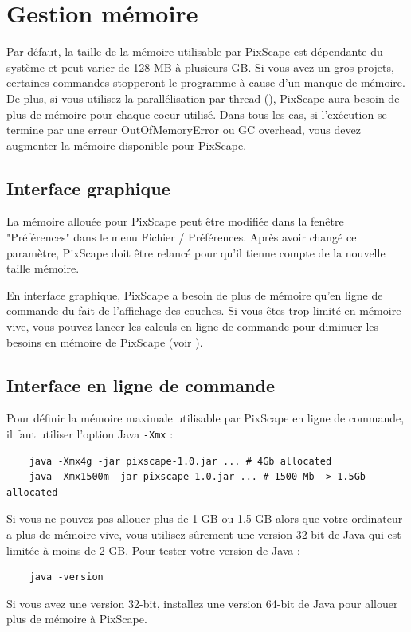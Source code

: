 \documentclass{report}
\begin{document}
\section{Gestion mémoire}
\label{memory}
Par défaut, la taille de la mémoire utilisable par PixScape est dépendante du système et peut varier de 128 MB à plusieurs GB.
Si vous avez un gros projets, certaines commandes stopperont le programme à cause d'un manque de mémoire. De plus, si vous utilisez la parallélisation par thread (), PixScape aura besoin de plus de mémoire pour chaque coeur utilisé.
Dans tous les cas, si l'exécution se termine par une erreur OutOfMemoryError ou GC overhead, vous devez augmenter la mémoire disponible pour PixScape.

\subsection{Interface graphique}
La mémoire allouée pour PixScape peut être modifiée dans la fenêtre "Préférences" dans le menu Fichier / Préférences. Après avoir changé ce paramètre, PixScape doit être relancé pour qu'il tienne compte de la nouvelle taille mémoire.

En interface graphique, PixScape a besoin de plus de mémoire qu'en ligne de commande du fait de l'affichage des couches. Si vous êtes trop limité en mémoire vive, vous pouvez lancer les calculs en ligne de commande pour diminuer les besoins en mémoire de PixScape (voir ).

\subsection{Interface en ligne de commande}
Pour définir la mémoire maximale utilisable par PixScape en ligne de commande, il faut utiliser l'option Java \verb|-Xmx| :
\begin{Verbatim}
	java -Xmx4g -jar pixscape-1.0.jar ... # 4Gb allocated
	java -Xmx1500m -jar pixscape-1.0.jar ... # 1500 Mb -> 1.5Gb allocated
\end{Verbatim}


Si vous ne pouvez pas allouer plus de 1 GB ou 1.5 GB alors que votre ordinateur a plus de mémoire vive, vous utilisez sûrement une version 32-bit de Java qui est limitée à moins de 2 GB.
Pour tester votre version de Java :
\begin{Verbatim}
	java -version
\end{Verbatim}
Si vous avez une version 32-bit, installez une version 64-bit de Java pour allouer plus de mémoire à PixScape.


\end{document}
